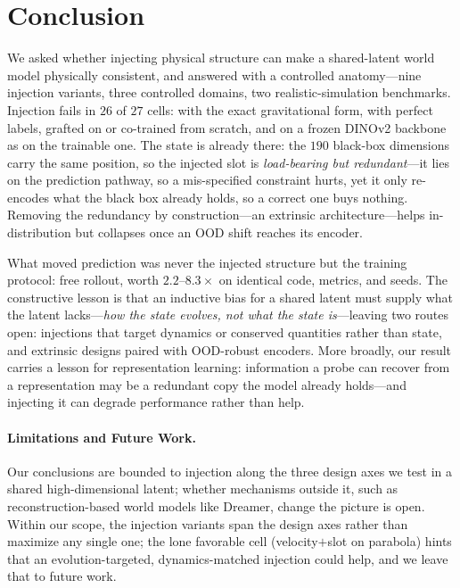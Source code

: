 \section{Conclusion}
\label{sec:conclusion}

We asked whether injecting physical structure can make a shared-latent world model physically consistent, and answered with a controlled anatomy---nine injection variants, three controlled domains, two realistic-simulation benchmarks. Injection fails in $26$ of $27$ cells: with the exact gravitational form, with perfect labels, grafted on or co-trained from scratch, and on a frozen DINOv2 backbone as on the trainable one. The state is already there: the $190$ black-box dimensions carry the same position, so the injected slot is \emph{load-bearing but redundant}---it lies on the prediction pathway, so a mis-specified constraint hurts, yet it only re-encodes what the black box already holds, so a correct one buys nothing. Removing the redundancy by construction---an extrinsic architecture---helps in-distribution but collapses once an OOD shift reaches its encoder.

What moved prediction was never the injected structure but the training protocol: free rollout, worth $2.2$--$8.3\times$ on identical code, metrics, and seeds. The constructive lesson is that an inductive bias for a shared latent must supply what the latent lacks---\emph{how the state evolves, not what the state is}---leaving two routes open: injections that target dynamics or conserved quantities rather than state, and extrinsic designs paired with OOD-robust encoders. More broadly, our result carries a lesson for representation learning: information a probe can recover from a representation may be a redundant copy the model already holds---and injecting it can degrade performance rather than help.

\paragraph{Limitations and Future Work.}
Our conclusions are bounded to injection along the three design axes we test in a shared high-dimensional latent; whether mechanisms outside it, such as reconstruction-based world models like Dreamer, change the picture is open. Within our scope, the injection variants span the design axes rather than maximize any single one; the lone favorable cell (velocity$+$slot on parabola) hints that an evolution-targeted, dynamics-matched injection could help, and we leave that to future work.
